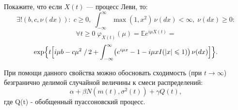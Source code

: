 \begin{problem}
Покажите, что если $X(t)$ --- процесс Леви, то: 
$$
\exists ! (b,c,\nu(dx)): \; 
c\geqslant 0, \; \int_{-\infty}^{\infty} \max(1,x^2)\, \nu(dx)<\infty, \; \nu(dx)\geqslant 0 : 
$$
\[
\forall t\geqslant 0 \;  \varphi_{X(t)}(\mu)={\mathbb E}e^{i\mu X(t)}=  
\]
\[
\exp \Bigl\{ t\Bigl[ i\mu b-c\mu^2\left.\right/2+
\int_{-\infty}^{\infty} \bigl( e^{i\mu x}-1-i\mu x I(|x|\leqslant 1) \bigr)\, \nu(dx) 
\Bigr] \Bigr\} . 
\]

\end{problem}

\begin{remark}
При помощи данного свойства можно обосновать сходимость (при  $t \rightarrow \infty$) безгранично делимой случайной величины к смеси распределений: 
\[
\alpha + \beta N(m(t), \sigma^2(t)) + \gamma Q(t),
\]
\noindent где Q(t) - обобщенный пуассоновский процесс.
\end{remark}





